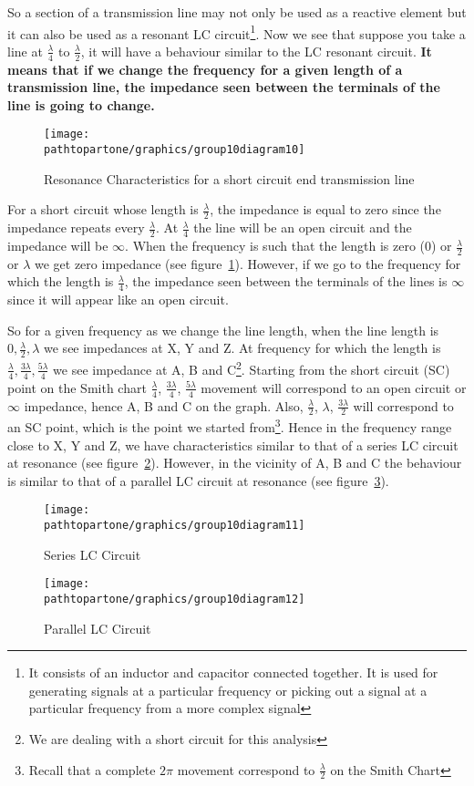So a section of a transmission line may not only be used as a reactive element but it can also be used as a resonant LC circuit\footnote{
	It consists of an inductor and capacitor connected together. It is used for generating signals at a particular frequency or picking out a signal at a particular frequency from a more complex signal
}. Now we see that suppose you take a line at $ \frac{\lambda}{4} $ to $ \frac{\lambda}{2} $, it will have a behaviour similar to the LC resonant circuit. \textbf{It means that if we change the frequency for a given length of a transmission line, the impedance seen between the terminals of the line is going to change.}
\begin{figure}[ht]
	\centering
	\texttt{[image: \\pathtopartone/graphics/group10diagram10]}
	\caption{Resonance Characteristics for a short circuit end transmission line}
	\label{fig:group10diagram11}
\end{figure}

For a short circuit whose length is $ \frac{\lambda}{2} $, the impedance is equal to zero since the impedance repeats every $\frac{\lambda}{2}$. At $ \frac{\lambda}{4} $ the line will be an open circuit and the impedance will be $\infty$. When the frequency is such that the length is zero (0) or $ \frac{\lambda}{2} $ or $ \lambda $ we get zero impedance (see figure~\ref{fig:group10diagram11}). However, if we go to the frequency for which the length is $ \frac{\lambda}{4} $, the impedance seen between the terminals of the lines is $\infty$ since it will appear like an open circuit.

So for a given frequency as we change the line length, when the line length is $ 0, \frac{\lambda}{2}, \lambda $ we see impedances at X, Y and Z. At frequency for which the length is $ \frac{\lambda}{4}, \frac{3\lambda}{4}, \frac{5\lambda}{4} $ we see impedance at A, B and C\footnote{
	We are dealing with a short circuit for this analysis
}. Starting from the short circuit (SC) point on the Smith chart $ \frac{\lambda}{4} $, $ \frac{3\lambda}{4} $, $ \frac{5\lambda}{4} $ movement will correspond to an open circuit or $ \infty $ impedance, hence A, B and C on the graph. Also, $ \frac{\lambda}{2} $, $ \lambda $, $ \frac{3\lambda}{2} $ will correspond to an SC point, which is the point we started from\footnote{
	Recall that a complete $ 2\pi $ movement correspond to $ \frac{\lambda}{2} $ on the Smith Chart
}. Hence in the frequency range close to X, Y and Z, we have characteristics similar to that of a series LC circuit
at resonance (see figure~\ref{fig:group10diagram12}). However, in the vicinity of A, B and C the behaviour is similar to that of a parallel LC circuit at resonance (see figure~\ref{fig:group10diagram13}). 
\begin{figure}[ht]
	\centering
	\texttt{[image: \\pathtopartone/graphics/group10diagram11]}
	\caption{Series LC Circuit}
	\label{fig:group10diagram12}
\end{figure}
\begin{figure}[ht]
	\centering
	\texttt{[image: \\pathtopartone/graphics/group10diagram12]}
	\caption{Parallel LC Circuit}
	\label{fig:group10diagram13}
\end{figure}

